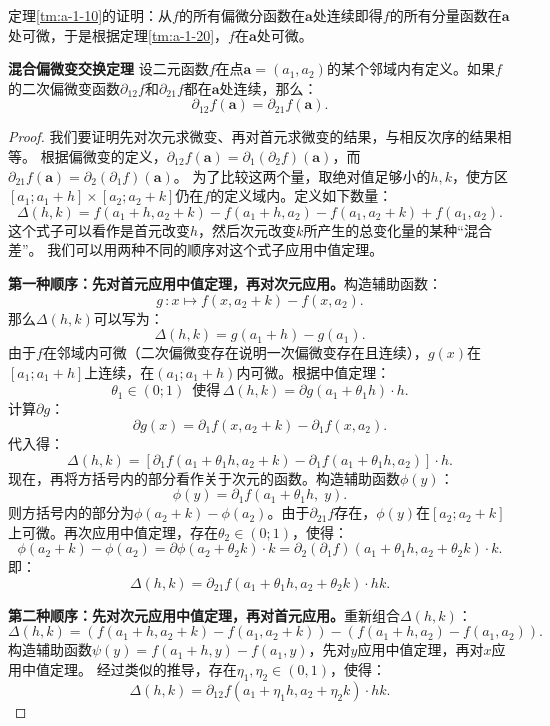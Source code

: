\documentclass[12pt,UTF8,fontset=none]{ctexbook}
\begin{document}
\begin{appendix}
定理\ref{tm:a-1-10}的证明：从$f$的所有偏微分函数在$\mathbf{a}$处连续即得$f$的所有分量函数在$\mathbf{a}$处可微，于是根据定理\ref{tm:a-1-20}，$f$在$\mathbf{a}$处可微。

\begin{tm}{\textbf{混合偏微变交换定理}}
设二元函数$f$在点$\mathbf{a}=(a_1, a_2)$的某个邻域内有定义。如果$f$的二次偏微变函数$\partial_{12} f$和$\partial_{21} f$都在$\mathbf{a}$处连续，那么：
$$ \partial_{12} f(\mathbf{a}) = \partial_{21} f(\mathbf{a}). $$
\end{tm}
\begin{proof}
我们要证明先对次元求微变、再对首元求微变的结果，与相反次序的结果相等。
根据偏微变的定义，$\partial_{12} f(\mathbf{a}) = \partial_1 (\partial_2 f)(\mathbf{a})$，而$\partial_{21} f(\mathbf{a}) = \partial_2 (\partial_1 f)(\mathbf{a})$。
为了比较这两个量，取绝对值足够小的$h, k$，使方区$[a_1;a_1+h]\times[a_2;a_2+k]$仍在$f$的定义域内。定义如下数量：
$$ \Delta(h, k) = f(a_1+h, a_2+k) - f(a_1+h, a_2) - f(a_1, a_2+k) + f(a_1, a_2). $$
这个式子可以看作是首元改变$h$，然后次元改变$k$所产生的总变化量的某种“混合差”。
我们可以用两种不同的顺序对这个式子应用中值定理。

\textbf{第一种顺序：先对首元应用中值定理，再对次元应用。}构造辅助函数：
$$ g \, : x \mapsto f(x, a_2+k) - f(x, a_2). $$
那么$\Delta(h, k)$可以写为：
$$ \Delta(h, k) = g(a_1+h) - g(a_1). $$
由于$f$在邻域内可微（二次偏微变存在说明一次偏微变存在且连续），$g(x)$在$[a_1; a_1+h]$上连续，在$(a_1; a_1+h)$内可微。根据中值定理：
$$ \theta_1 \in (0;1)\,\,\,\mbox{使得}\,\Delta(h, k) = \partial g(a_1 + \theta_1 h) \cdot h. $$
计算$\partial g$：
$$ \partial g(x) = \partial_1 f(x, a_2+k) - \partial_1 f(x, a_2). $$
代入得：
$$ \Delta(h, k) = \left[ \partial_1 f(a_1 + \theta_1 h, a_2+k) - \partial_1 f(a_1 + \theta_1 h, a_2) \right] \cdot h. $$
现在，再将方括号内的部分看作关于次元的函数。构造辅助函数$\phi(y)$：
$$ \phi(y) = \partial_1 f(a_1 + \theta_1 h,\; y). $$
则方括号内的部分为$\phi(a_2+k) - \phi(a_2)$。由于$\partial_{21} f$存在，$\phi(y)$在$[a_2; a_2+k]$上可微。再次应用中值定理，存在$\theta_2 \in (0;1)$，使得：
$$ \phi(a_2+k) - \phi(a_2) =\partial  \phi(a_2 + \theta_2 k) \cdot k = \partial_2 (\partial_1 f)(a_1 + \theta_1 h, a_2 + \theta_2 k) \cdot k. $$
即：
$$ \Delta(h, k) = \partial_{21} f(a_1 + \theta_1 h, a_2 + \theta_2 k) \cdot h k. $$

\textbf{第二种顺序：先对次元应用中值定理，再对首元应用。}重新组合$\Delta(h, k)$：
$$ \Delta(h, k) = \left( f(a_1+h, a_2+k) - f(a_1, a_2+k) \right) - \left( f(a_1+h, a_2) - f(a_1, a_2) \right). $$
构造辅助函数$\psi(y) = f(a_1+h, y) - f(a_1, y)$，先对$y$应用中值定理，再对$x$应用中值定理。
经过类似的推导，存在$\eta_1, \eta_2 \in (0, 1)$，使得：
$$ \Delta(h, k) = \partial_{12} f(a_1 + \eta_1 h, a_2 + \eta_2 k) \cdot h k. $$


\end{proof}
\end{appendix}
\end{document}
